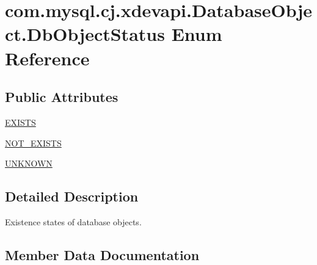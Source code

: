 \hypertarget{enumcom_1_1mysql_1_1cj_1_1xdevapi_1_1_database_object_1_1_db_object_status}{}\section{com.\+mysql.\+cj.\+xdevapi.\+Database\+Object.\+Db\+Object\+Status Enum Reference}
\label{enumcom_1_1mysql_1_1cj_1_1xdevapi_1_1_database_object_1_1_db_object_status}
\subsection*{Public Attributes}
\begin{DoxyCompactItemize}
\item 
\mbox{\hyperlink{enumcom_1_1mysql_1_1cj_1_1xdevapi_1_1_database_object_1_1_db_object_status_ab311f9439f2cc5a20a787d4a3345e689}{E\+X\+I\+S\+TS}}
\item 
\mbox{\hyperlink{enumcom_1_1mysql_1_1cj_1_1xdevapi_1_1_database_object_1_1_db_object_status_a9f8e319c4f1c12abb733d11495de154a}{N\+O\+T\+\_\+\+E\+X\+I\+S\+TS}}
\item 
\mbox{\hyperlink{enumcom_1_1mysql_1_1cj_1_1xdevapi_1_1_database_object_1_1_db_object_status_afa43291eef691fd6e3b4ed8e819cd348}{U\+N\+K\+N\+O\+WN}}
\end{DoxyCompactItemize}


\subsection{Detailed Description}
Existence states of database objects. 

\subsection{Member Data Documentation}
\mbox{\label{enumcom_1_1mysql_1_1cj_1_1xdevapi_1_1_database_object_1_1_db_object_status_ab311f9439f2cc5a20a787d4a3345e689}} 
